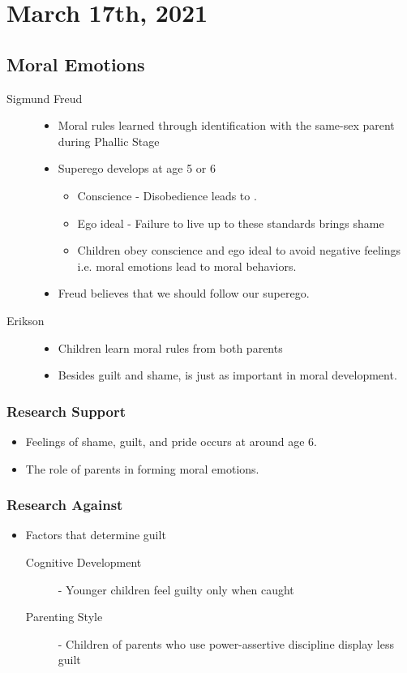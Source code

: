 \documentclass[../main/main.tex]{subfiles}
\begin{document}
\section{March 17th, 2021}
\subsection{Moral Emotions}
\begin{description}
  \item[Sigmund Freud]
\begin{itemize}
\item Moral rules learned through identification with the same-sex parent during Phallic Stage
  \item Superego develops at age 5 or 6
        \begin{itemize}
\item Conscience - Disobedience leads to .
          \item Ego ideal - Failure to live up to these standards brings shame
                \item Children obey conscience and ego ideal to avoid negative feelings i.e. moral emotions lead to moral behaviors.
        \end{itemize}
\item Freud believes that we should follow our superego.
\end{itemize}
        \item[Erikson]
        \begin{itemize}
          \item Children learn moral rules from both parents
                \item Besides guilt and shame,  is just as important in moral development.
        \end{itemize}

\end{description}

\subsubsection{Research Support}
\begin{itemize}
\item Feelings of shame, guilt, and pride occurs at around age 6.
        \item The role of parents in forming moral emotions.
\end{itemize}
\subsubsection{Research Against}
\begin{itemize}
  \item Factors that determine guilt
\begin{description}
        \item[Cognitive Development]- Younger children feel guilty only when caught
  \item[Parenting Style] - Children of parents who use power-assertive discipline display less guilt
\end{description}
\end{itemize}
\end{document}
